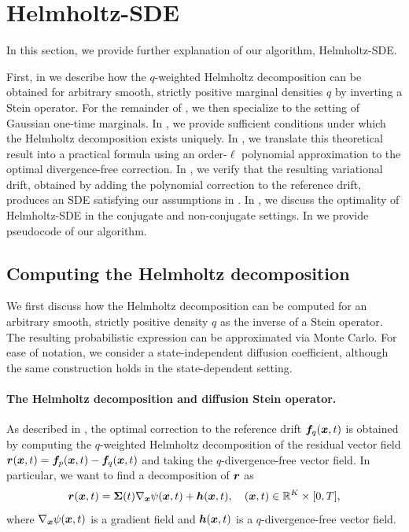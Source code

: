 \section{Helmholtz-SDE}\label{app:sec:helm-sde}

In this section, we provide further explanation of our algorithm, Helmholtz-SDE.

First, in  we describe how the $q$-weighted Helmholtz decomposition can be obtained for arbitrary smooth, strictly positive marginal densities $q$ by inverting a Stein operator.
For the remainder of , we then specialize to the setting of Gaussian one-time marginals.
In , we provide sufficient conditions under which the Helmholtz decomposition exists uniquely.
In , we translate this theoretical result into a practical formula using an order-$\ell$ polynomial approximation to the optimal divergence-free correction.
In , we verify that the resulting variational drift, obtained by adding the polynomial correction to the reference drift, produces an SDE satisfying our assumptions in .
In , we discuss the optimality of Helmholtz-SDE in the conjugate and non-conjugate settings.
In  we provide pseudocode of our algorithm.

\subsection{Computing the Helmholtz decomposition}\label{app:subsec:helmholtz-compute}

We first discuss how the Helmholtz decomposition can be computed for an arbitrary smooth, strictly positive density $q$ as the inverse of a Stein operator. The resulting probabilistic expression can be approximated via Monte Carlo. For ease of notation, we consider a state-independent diffusion coefficient, although the same construction holds in the state-dependent setting.

\paragraph{The Helmholtz decomposition and diffusion Stein operator.}
As described in , the optimal correction to the reference drift $\boldsymbol{f}_q(\boldsymbol{x}, t)$ is obtained by computing the $q$-weighted Helmholtz decomposition of the residual vector field $\boldsymbol{r}(\boldsymbol{x}, t) = \boldsymbol{f}_p(\boldsymbol{x}, t) - \boldsymbol{f}_q(\boldsymbol{x}, t)$ and taking the $q$-divergence-free vector field.
In particular, we want to find a decomposition of $\boldsymbol{r}$ as
\begin{equation}\label{app:eqn:helm-decomp}
    \boldsymbol{r}(\boldsymbol{x}, t) = \boldsymbol{\Sigma}(t) \nabla_{\boldsymbol{x}} \psi(\boldsymbol{x}, t) + \boldsymbol{h}(\boldsymbol{x}, t), \quad (\boldsymbol{x}, t) \in \mathbb{R}^K \times [0, T],
\end{equation}
where $\nabla_{\boldsymbol{x}} \psi(\boldsymbol{x}, t)$ is a gradient field and $\boldsymbol{h}(\boldsymbol{x}, t)$ is a $q$-divergence-free vector field.


